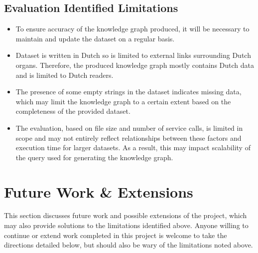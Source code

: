 \subsection{Evaluation Identified Limitations}
\begin{itemize}
    \item To ensure accuracy of the knowledge graph produced, it will be necessary to maintain and update the dataset on a regular basis.
    \item Dataset is written in Dutch so is limited to external links surrounding Dutch organs. Therefore, the produced knowledge graph mostly contains Dutch data and is limited to Dutch readers. 
    \item The presence of some empty strings in the dataset indicates missing data, which may limit the knowledge graph to a certain extent based on the completeness of the provided dataset.
    \item  The evaluation, based on file size and number of service calls, is limited in scope and may not entirely reflect relationships between these factors and execution time for larger datasets. As a result, this may impact scalability of the query used for generating the knowledge graph.
\end{itemize}

\section{Future Work \& Extensions}
\hspace{0.5cm} This section discusses future work and possible extensions of the project, which may also provide solutions to the limitations identified above. Anyone willing to continue or extend work completed in this project is welcome to take the directions detailed below, but should also be wary of the limitations noted above. 

